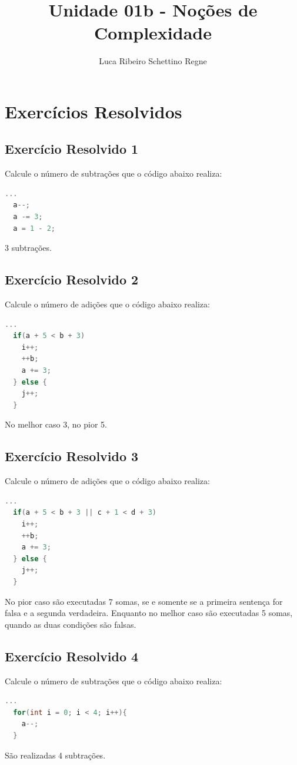 \documentclass[12pt]{article}
\title{Unidade 01b - Noções de Complexidade}
\author{Luca Ribeiro Schettino Regne}
\begin{document}
 

\maketitle

\section{Exercícios Resolvidos}

\subsection{Exercício Resolvido 1}
Calcule o número de subtrações que o código abaixo realiza:\\
\begin{lstlisting}[language=C]
  ...
  a--;
  a -= 3;
  a = 1 - 2;
\end{lstlisting}
3 subtrações.

\subsection{Exercício Resolvido 2}
Calcule o número de adições que o código abaixo realiza:
\begin{lstlisting}[language=C]
  ...
  if(a + 5 < b + 3)
    i++;
    ++b;
    a += 3;
  } else {
    j++;
  }
\end{lstlisting}
No melhor caso 3, no pior 5.

\subsection{Exercício Resolvido 3}
Calcule o número de adições que o código abaixo realiza:
\begin{lstlisting}[language=C]
  ...
  if(a + 5 < b + 3 || c + 1 < d + 3)
    i++;
    ++b;
    a += 3;
  } else {
    j++;
  }
\end{lstlisting}
No pior caso são executadas 7 somas, se e somente se a primeira sentença for falsa e a segunda verdadeira.
Enquanto no melhor caso são executadas 5 somas, quando as duas condições são falsas.

\subsection{Exercício Resolvido 4}
Calcule o número de subtrações que o código abaixo realiza:
\begin{lstlisting}[language=C]
  ...
  for(int i = 0; i < 4; i++){
    a--;
  }
\end{lstlisting}
São realizadas 4 subtrações.
\end{document}
